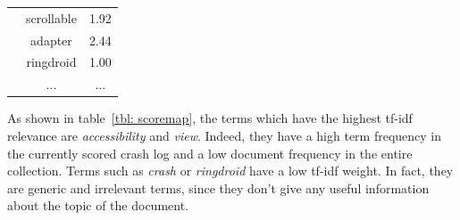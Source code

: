 \begin{table}[tb]
\begin{tabular}{l|c|c|}
                                                                                                            & scrollable                            & 1.92                                  \\ \cline{2-3} 
                                                                                                            & adapter                               & 2.44                                  \\ \cline{2-3} 
                                                                                                            & ringdroid                             & 1.00                                  \\ \cline{2-3} 
                                                                                                            & ...                             & ...                                  
\end{tabular}
\end{table}

As shown in table~\ref{tbl: scoremap}, the terms which have the highest tf-idf relevance are \textit{accessibility} and \textit{view}. Indeed, they have a high term frequency in the currently scored crash log and a low document frequency in the entire collection. 
Terms such as \textit{crash} or \textit{ringdroid} have a low tf-idf weight. In fact, they are generic and irrelevant terms, since they don't give any useful information about the topic of the document. \\

